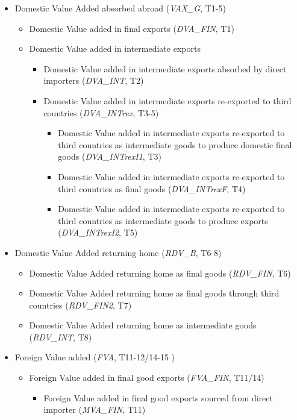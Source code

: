 \documentclass{article}\usepackage[]{graphicx}\usepackage[]{color}
\begin{document}
\begin{itemize}
\item Domestic Value Added absorbed abroad (\textit{VAX\_G}, T1-5)
\begin{itemize}
\item Domestic Value added in final exports (\textit{DVA\_FIN}, T1)
\item Domestic Value added in intermediate exports
\begin{itemize}
\item Domestic Value added in intermediate exports absorbed by direct importers (\textit{DVA\_INT}, T2)
\item Domestic Value added in intermediate exports re-exported to third countries (\textit{DVA\_INTrex}, T3-5)
\begin{itemize}
\item Domestic Value added in intermediate exports re-exported to third countries as intermediate goods to produce domestic final goods (\textit{DVA\_INTrexI1}, T3)
\item Domestic Value added in intermediate exports re-exported to third countries as  final goods (\textit{DVA\_INTrexF}, T4)
\item Domestic Value added in intermediate exports re-exported to third countries as intermediate goods to produce exports (\textit{DVA\_INTrexI2}, T5)
\end{itemize}
\end{itemize}
\end{itemize}
\item Domestic Value Added returning home (\textit{RDV\_B}, T6-8)
\begin{itemize}
\item Domestic Value Added returning home as final goods (\textit{RDV\_FIN}, T6)
\item Domestic Value Added returning home as final goods through third countries (\textit{RDV\_FIN2}, T7)
\item Domestic Value Added returning home as intermediate goods (\textit{RDV\_INT}, T8)
\end{itemize}
\item Foreign Value added (\textit{FVA}, T11-12/14-15 )
\begin{itemize}
\item Foreign Value added in final good exports (\textit{FVA\_FIN}, T11/14)
\begin{itemize}
\item Foreign Value added in final good exports sourced from direct importer (\textit{MVA\_FIN}, T11)

\end{itemize}
\end{itemize}
\end{itemize}
\end{document}
